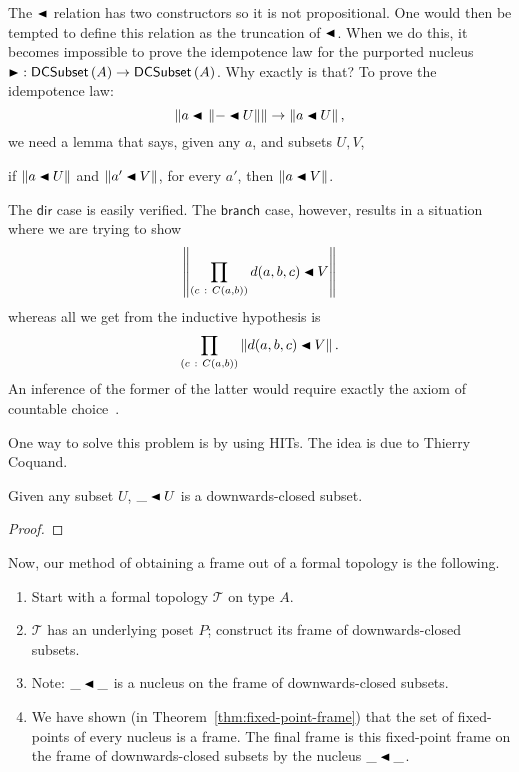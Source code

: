 The $\covers{}{}$ relation has two constructors so it is not propositional. One would then
be tempted to define this relation as the truncation of $\covers{}{}$. When we do this, it
becomes impossible to prove the idempotence law for the purported nucleus $\RHD :
\dcsubset{A} \rightarrow \dcsubset{A}$. Why exactly is that? To prove the idempotence law:
\begin{equation*}
  \trunc{\covers{a}{\trunc{\covers{-}{U}}}} \rightarrow \trunc{\covers{a}{U}},
\end{equation*}
we need a lemma that says, given any $a$, and subsets $U, V$,
\begin{center}
  if $\trunc{\covers{a}{U}}$ and $\trunc{\covers{a'}{V}}$, for every $a'$, then
  $\trunc{\covers{a}{V}}$.
\end{center}
The $\mathsf{dir}$ case is easily verified. The $\mathsf{branch}$ case, however, results
in a situation where we are trying to show
\begin{equation*}
  \trunc{\pity{c}{C(a, b)}{\covers{d(a, b, c)}{V}}}
\end{equation*}
whereas all we get from the inductive hypothesis is
\begin{equation*}
  \pity{c}{C(a, b)}{\trunc{\covers{d(a, b, c)}{V}}}.
\end{equation*}
An inference of the former of the latter would require exactly the axiom of countable
choice~\cite{axiom-of-choice}.

One way to solve this problem is by using HITs. The idea is due to Thierry Coquand.

\begin{thm}
  Given any subset $U$, $\covers{\_}{U}$ is a downwards-closed subset.
\end{thm}
\begin{proof}
\end{proof}

Now, our method of obtaining a frame out of a formal topology is the following.
\begin{enumerate}
  \item Start with a formal topology $\mathcal{T}$ on type $A$.
  \item $\mathcal{T}$ has an underlying poset $P$; construct its frame of downwards-closed
    subsets.
  \item Note: $\covers{\_}{\_}$ is a nucleus on the frame of downwards-closed subsets.
  \item We have shown (in Theorem~\ref{thm:fixed-point-frame}) that the set of
    fixed-points of every nucleus is a frame. The final frame is this fixed-point frame
    on the frame of downwards-closed subsets by the nucleus $\covers{\_}{\_}$.
\end{enumerate}


